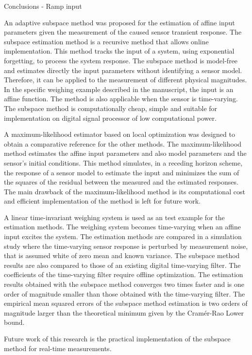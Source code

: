 Conclusions - Ramp input

An adaptive subspace method was proposed for the estimation of affine input parameters given the measurement of the caused sensor transient response. 
The subspace estimation method is a recursive method that allows online implementation.
This method tracks the input of a system, using exponential forgetting, to process the system response.
The subspace method is model-free and estimates directly the input parameters without identifying a sensor model.
Therefore, it can be applied to the measurement of different physical magnitudes.
In the specific weighing example described in the manuscript, the input is an affine function.
The method is also applicable when the sensor is time-varying.
The subspace method is computationally cheap, simple and suitable for implementation on digital signal processor of low computational power. 

A maximum-likelihood estimator based on local optimization was designed to obtain a comparative reference for the other methods.
The maximum-likelihood method estimates the affine input parameters and also model parameters and the sensor's initial conditions.
This method simulates, in a receding horizon scheme, the response of a sensor model to estimate the input and minimizes the sum of the squares of the residual between the measured and the estimated responses.
The main drawback of the maximum-likelihood method is its computational cost and efficient implementation of the method is left for future work.

A linear time-invariant weighing system is used as an test example for the estimation methods.
The weighing system becomes time-varying when an affine input excites the system.
The estimation methods are compared in a simulation study where the time-varying sensor response is perturbed by measurement noise, that is assumed white of zero mean and known variance.
The subspace method results are also compared to those of an existing digital time-varying filter.
The coefficients of the time-varying filter require offline optimization.
The estimation results obtained with the subspace method converges two times faster and is one order of magnitude smaller than those obtained with the time-varying filter.
The empirical mean squared errors of the subspace method estimation is two orders of magnitude larger than the theoretical minimum given by the Cram\'er-Rao Lower bound.

Future work of this research is the practical implementation of the subspace method for real-time measurements.

